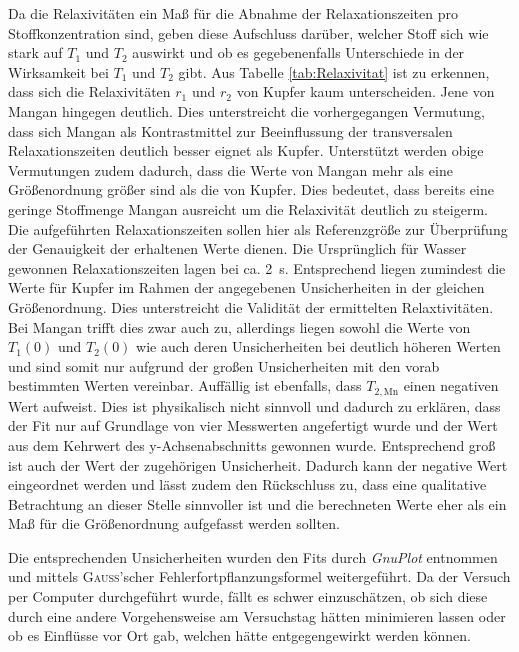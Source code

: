 Da die Relaxivitäten ein Maß für die Abnahme der Relaxationszeiten pro Stoffkonzentration sind, geben diese Aufschluss darüber, welcher Stoff sich wie stark auf $T_1$ und $T_2$ auswirkt und ob es gegebenenfalls Unterschiede in der Wirksamkeit bei $T_1$ und $T_2$ gibt.
Aus Tabelle \ref{tab:Relaxivitat} ist zu erkennen, dass sich die Relaxivitäten $r_1$ und $r_2$ von Kupfer kaum unterscheiden.
Jene von Mangan hingegen deutlich.
Dies unterstreicht die vorhergegangen Vermutung, dass sich Mangan als Kontrastmittel zur Beeinflussung der transversalen Relaxationszeiten deutlich besser eignet als Kupfer.
Unterstützt werden obige Vermutungen zudem dadurch, dass die Werte von Mangan mehr als eine Größenordnung größer sind als die von Kupfer.
Dies bedeutet, dass bereits eine geringe Stoffmenge Mangan ausreicht um die Relaxivität deutlich zu steigerm.
Die aufgeführten Relaxationszeiten sollen hier als Referenzgröße zur Überprüfung der Genauigkeit der erhaltenen Werte dienen.
Die Ursprünglich für Wasser gewonnen Relaxationszeiten lagen bei ca. \SI{2}{\second}.
Entsprechend liegen zumindest die Werte für Kupfer im Rahmen der angegebenen Unsicherheiten in der gleichen Größenordnung.
Dies unterstreicht die Validität der ermittelten Relaxtivitäten.
Bei Mangan trifft dies zwar auch zu, allerdings liegen sowohl die Werte von $T_1(0)$ und $T_2(0)$ wie auch deren Unsicherheiten bei deutlich höheren Werten und sind somit nur aufgrund der großen Unsicherheiten mit den vorab bestimmten Werten vereinbar.
Auffällig ist ebenfalls, dass $T_{2,\text{Mn}}$ einen negativen Wert aufweist.
Dies ist physikalisch nicht sinnvoll und dadurch zu erklären, dass der Fit nur auf Grundlage von vier Messwerten angefertigt wurde und der Wert aus dem Kehrwert des y-Achsenabschnitts gewonnen wurde.
Entsprechend groß ist auch der Wert der zugehörigen Unsicherheit.
Dadurch kann der negative Wert eingeordnet werden und lässt zudem den Rückschluss zu, dass eine qualitative Betrachtung an dieser Stelle sinnvoller ist und die berechneten Werte eher als ein Maß für die Größenordnung aufgefasst werden sollten.

Die entsprechenden Unsicherheiten wurden den Fits durch \textit{GnuPlot} entnommen und mittels \textsc{Gauss}'scher Fehlerfortpflanzungsformel weitergeführt.
Da der Versuch per Computer durchgeführt wurde, fällt es schwer einzuschätzen, ob sich diese durch eine andere Vorgehensweise am Versuchstag hätten minimieren lassen oder ob es Einflüsse vor Ort gab, welchen hätte entgegengewirkt werden können.
    

%     
